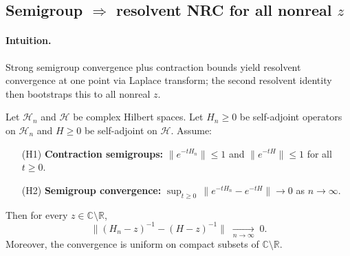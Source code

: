 \documentclass[11pt]{amsart}
\begin{document}
\subsection*{Semigroup $\Rightarrow$ resolvent NRC for all nonreal $z$}

\paragraph{Intuition.} Strong semigroup convergence plus contraction bounds yield resolvent convergence at one point via Laplace transform; the second resolvent identity then bootstraps this to all nonreal $z$.

\begin{theorem}\label{thm:NRC-allz}
Let $\mathcal{H}_n$ and $\mathcal{H}$ be complex Hilbert spaces. Let $H_n\ge 0$ be self-adjoint operators on $\mathcal{H}_n$ and $H\ge 0$ be self-adjoint on $\mathcal{H}$. Assume:
\begin{itemize}
  \item[(H1)] \textbf{Contraction semigroups:} $\|e^{-tH_n}\| \le 1$ and $\|e^{-tH}\| \le 1$ for all $t \ge 0$.
  \item[(H2)] \textbf{Semigroup convergence:} $\sup_{t\ge 0}\,\|e^{-tH_n}-e^{-tH}\|\to 0$ as $n\to\infty$.
\end{itemize}
Then for every $z\in\mathbb C\setminus\mathbb R$,
\[
  \|(H_n-z)^{-1}-(H-z)^{-1}\|\;\xrightarrow[n\to\infty]{}\;0.
\]
Moreover, the convergence is uniform on compact subsets of $\mathbb{C} \setminus \mathbb{R}$.
\end{theorem}
\end{document}

